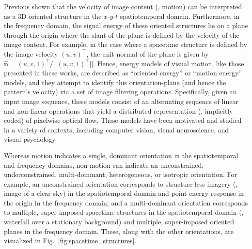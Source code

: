 Previous  \cite{adelson1985spatiotemporal,fahle1981,heeger1988,simoncelli1998,watson1983,nishimoto2011,derpanis2012spacetime}  shown that the velocity of image content (\ie, motion) can be interpreted as a 3D oriented structure in the $x$-$y$-$t$ spatiotemporal domain. Furthermore, in the frequency domain, the signal energy of these oriented structures lie on a plane through the origin where the slant of the plane is defined by the velocity of the image content.
For example, in the case where a spacetime structure is defined by the image velocity $(u, v)^\top$, the unit normal of the plane is given by $\hat{\mathbf{n}}=(u, v, 1)^\top / ||(u, v, 1)^\top||$.
Hence, energy models of visual motion, like those presented in these works, are described as ``oriented energy'' or ``motion energy'' models, and they attempt to identify this orientation-plane (and hence the pattern's velocity) via a set of image filtering operations. Specifically, given an input image sequence, these models consist of an alternating sequence of linear and non-linear operations that yield a distributed representation (\ie,  implicitly coded) of pixelwise
optical flow. These models have been motivated and studied in a variety of contexts, including computer vision, visual neuroscience, and visual psychology

Whereas motion indicates a single, dominant orientation in the spatiotemporal and frequency domains, non-motion can indicate an unconstrained, underconstrained, multi-dominant, heterogeneous, or isotropic orientation. For example, an unconstrained orientation corresponds to structure-less imagery (\eg, image of a clear sky) in the spatiotemporal domain and point energy response in the origin in the frequency domain; and a multi-dominant orientation corresponds to multiple, super-imposed spacetime structures in the spatiotemporal domain (\eg, waterfall over a stationary background) and multiple, super-imposed oriented planes in the frequency domain. These, along with the other orientations, are visualized in Fig.\ \ref{fig:spacetime_structures}.

